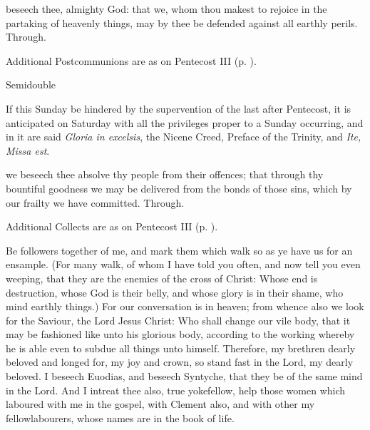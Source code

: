 \postcommunion
{} beseech thee, almighty God: that we, whom thou makest to rejoice in the partaking of heavenly things, may by thee be defended against all earthly perils. Through.
\begin{rubric}
    Additional Postcommunions are as on Pentecost III (p. \pageref{PentecostIII}).
\end{rubric}

\begin{inhead}
{Semidouble}
\end{inhead}
\begin{rubric}
	If this Sunday be hindered by the supervention of the last after Pentecost, it is anticipated on Saturday with all the privileges proper to a Sunday occurring, and in it are said \emph{Gloria in excelsis}, the Nicene Creed, Preface of the Trinity, and \emph{Ite, Missa est}.
\end{rubric}

\collect
{} we beseech thee absolve thy people from their offences; that through thy bountiful goodness we may be delivered from the bonds of those sins, which by our frailty we have committed. Through.
\begin{rubric}
    Additional Collects are as on Pentecost III (p. \pageref{PentecostIII}).
\end{rubric}

 Be followers together of me, and mark them which walk so as ye have us for an ensample. (For many walk, of whom I have told you often, and now tell you even weeping, that they are the enemies of the cross of Christ: Whose end is destruction, whose God is their belly, and whose glory is in their shame, who mind earthly things.) For our conversation is in heaven; from whence also we look for the Saviour, the Lord Jesus Christ: Who shall change our vile body, that it may be fashioned like unto his glorious body, according to the working whereby he is able even to subdue all things unto himself. Therefore, my brethren dearly beloved and longed for, my joy and crown, so stand fast in the Lord, my dearly beloved. I beseech Euodias, and beseech Syntyche, that they be of the same mind in the Lord. And I intreat thee also, true yokefellow, help those women which laboured with me in the gospel, with Clement also, and with other my fellowlabourers, whose names are in the book of life.


